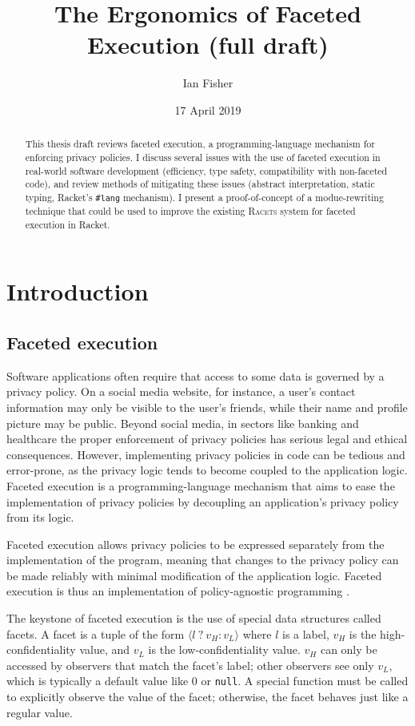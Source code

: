 \documentclass{article}
\title{The Ergonomics of Faceted Execution (full draft)}
\author{Ian Fisher}
\date{17 April 2019}
\begin{document}
\maketitle

\begin{abstract}
	This thesis draft reviews faceted execution, a programming-language mechanism for enforcing privacy policies. I discuss several issues with the use of faceted execution in real-world software development (efficiency, type safety, compatibility with non-faceted code), and review methods of mitigating these issues (abstract interpretation, static typing, Racket's \texttt{\#lang} mechanism). I present a proof-of-concept of a modue-rewriting technique that could be used to improve the existing \textsc{Racets} system \cite{racets} for faceted execution in Racket.
\end{abstract}

\tableofcontents



\section{Introduction}
\subsection{Faceted execution\label{sec:facets}}
Software applications often require that access to some data is governed by a privacy policy. On a social media website, for instance, a user's contact information may only be visible to the user's friends, while their name and profile picture may be public. Beyond social media, in sectors like banking and healthcare the proper enforcement of privacy policies has serious legal and ethical consequences. However, implementing privacy policies in code can be tedious and error-prone, as the privacy logic tends to become coupled to the application logic. Faceted execution is a programming-language mechanism that aims to ease the implementation of privacy policies by decoupling an application's privacy policy from its logic.

Faceted execution allows privacy policies to be expressed separately from the implementation of the program, meaning that changes to the privacy policy can be made reliably with minimal modification of the application logic. Faceted execution is thus an implementation of policy-agnostic programming \cite{faceted}.

The keystone of faceted execution is the use of special data structures called facets. A facet is a tuple of the form $\langle l\ ?\ v_H : v_L \rangle$ where $l$ is a label, $v_H$ is the high-confidentiality value, and $v_L$ is the low-confidentiality value. $v_H$ can only be accessed by observers that match the facet's label; other observers see only $v_L$, which is typically a default value like $0$ or \texttt{null}. A special function must be called to explicitly observe the value of the facet; otherwise, the facet behaves just like a regular value.
\end{document}
